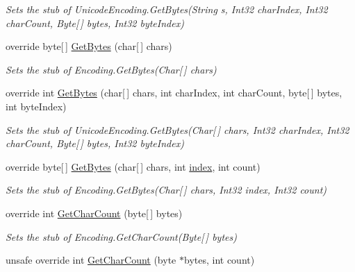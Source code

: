 \begin{DoxyCompactItemize}
\begin{DoxyCompactList}\small\item\em Sets the stub of Unicode\-Encoding.\-Get\-Bytes(\-String s, Int32 char\-Index, Int32 char\-Count, Byte\mbox{[}$\,$\mbox{]} bytes, Int32 byte\-Index)\end{DoxyCompactList}\item 
override byte\mbox{[}$\,$\mbox{]} \hyperlink{class_system_1_1_text_1_1_fakes_1_1_stub_unicode_encoding_ae86f6bae6a5673c851fffd371bf0b24b}{Get\-Bytes} (char\mbox{[}$\,$\mbox{]} chars)
\begin{DoxyCompactList}\small\item\em Sets the stub of Encoding.\-Get\-Bytes(\-Char\mbox{[}$\,$\mbox{]} chars)\end{DoxyCompactList}\item 
override int \hyperlink{class_system_1_1_text_1_1_fakes_1_1_stub_unicode_encoding_a964b63921c921fcaaa6ff55d5d0c9e9a}{Get\-Bytes} (char\mbox{[}$\,$\mbox{]} chars, int char\-Index, int char\-Count, byte\mbox{[}$\,$\mbox{]} bytes, int byte\-Index)
\begin{DoxyCompactList}\small\item\em Sets the stub of Unicode\-Encoding.\-Get\-Bytes(\-Char\mbox{[}$\,$\mbox{]} chars, Int32 char\-Index, Int32 char\-Count, Byte\mbox{[}$\,$\mbox{]} bytes, Int32 byte\-Index)\end{DoxyCompactList}\item 
override byte\mbox{[}$\,$\mbox{]} \hyperlink{class_system_1_1_text_1_1_fakes_1_1_stub_unicode_encoding_a4fa9c87edfab6e5062a844770dbafaed}{Get\-Bytes} (char\mbox{[}$\,$\mbox{]} chars, int \hyperlink{jquery-1_810_82-vsdoc_8js_a75bb12d1f23302a9eea93a6d89d0193e}{index}, int count)
\begin{DoxyCompactList}\small\item\em Sets the stub of Encoding.\-Get\-Bytes(\-Char\mbox{[}$\,$\mbox{]} chars, Int32 index, Int32 count)\end{DoxyCompactList}\item 
override int \hyperlink{class_system_1_1_text_1_1_fakes_1_1_stub_unicode_encoding_a6ddd322358326854406444bed0573681}{Get\-Char\-Count} (byte\mbox{[}$\,$\mbox{]} bytes)
\begin{DoxyCompactList}\small\item\em Sets the stub of Encoding.\-Get\-Char\-Count(\-Byte\mbox{[}$\,$\mbox{]} bytes)\end{DoxyCompactList}\item 
unsafe override int \hyperlink{class_system_1_1_text_1_1_fakes_1_1_stub_unicode_encoding_afaa9f5bb222b8452b0319f2247fdce81}{Get\-Char\-Count} (byte $\ast$bytes, int count)

\end{DoxyCompactItemize}
